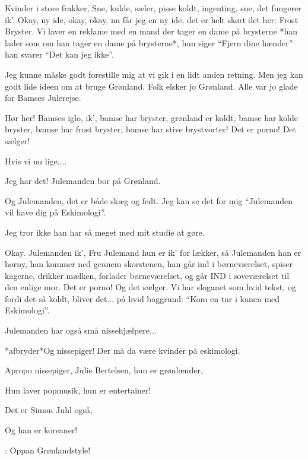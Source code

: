 \documentclass[a4paper,11pt]{article}
\begin{document}
\begin{sketch}
 Kvinder i store frakker, Sne, kulde, sæler, pisse koldt, ingenting, sne, det fungerer ik'. Okay, ny ide, okay, okay, nu får jeg en ny ide, det er helt skørt det her: Frost Bryster. Vi laver en reklame med en mand der tager en dame på brysterne *han lader som om han tager en dame på brysterne*, hun siger “Fjern dine hænder” han svarer “Det kan jeg ikke”.

 Jeg kunne måske godt forestille mig at vi gik i en lidt anden retning. Men jeg kan godt lide ideen om at bruge Grønland. Folk elsker jo Grønland. Alle var jo glade for Bamses Julerejse.

 Hør her! Bamses iglo, ik', bamse har bryster, grønland er koldt, bamse har kolde bryster, bamse har frost bryster, bamse har stive brystvorter! Det er porno! Det sælger!

 Hvis vi nu lige....

 Jeg har det! Julemanden bor på Grønland.

 Og Julemanden, det er både skæg og fedt. Jeg kan se det for mig “Julemanden vil have dig på Eskimologi”.

 Jeg tror ikke han har så meget med mit studie at gøre.

 Okay. Julemanden ik', Fru Julemand hun er ik' for lækker, så Julemanden han er horny, han kommer ned gennem skorstenen, han går ind i børneværelset, spiser kagerne, drikker mælken, forlader børneværelset, og går IND i soveværelset til den enlige mor. Det er porno! Og det sælger. Vi har sloganet som hvid tekst, og fordi det så koldt, bliver det... på hvid baggrund: “Kom en tur i kanen med Eskimologi”.


 Julemanden har også små nissehjælpere...

 *afbryder*Og nissepiger! Der må da være kvinder på eskimologi.

 Apropo nissepiger, Julie Bertelsen, hun er grønlænder, 

 Hun laver popmusik, hun er entertainer!

 Det er Simon Juhl også, 

 Og han er koreaner!

: Oppan Grønlandstyle!

\end{sketch}
\end{document}
